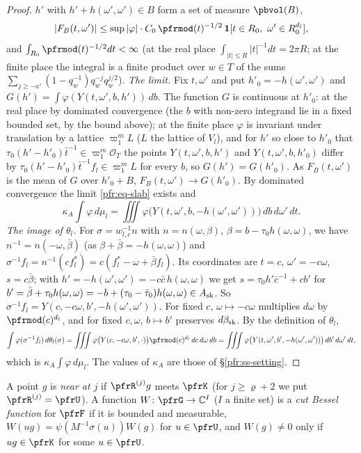 \documentclass[10pt]{amsart}
\theoremstyle{definition}
\theoremstyle{remark}
\newcommand{\C}{\mathbb C}
\providecommand{\auO}{\mathcal O}
\begin{document}
\begin{proof}
$h'$ with $h'+h(\omega',\omega')\in B$ form a set of measure $\pbvol(B)$,
\[
|F_B(t,\omega')|\le\sup|\varphi|\cdot C_0\,\pfrmod(t)^{-1/2}\,\mathbf 1[t\in R_0,\ \omega'\in R_0^{d_l}],
\]
and $\int_{R_0}\pfrmod(t)^{-1/2}dt<\infty$ (at the real place $\int_{|t|\le R}|t|^{-1}dt=2\pi R$; at the finite place
the integral is a finite product over $w\in T$ of the sums $\sum_{j\ge-a'}(1-q_w^{-1})q_w^{-j}q_w^{j/2}$).
\emph{The limit.} Fix $t,\omega'$ and put $h'_0=-h(\omega',\omega')$ and $G(h')=\int\varphi(Y(t,\omega',b,h'))\,db$. The
function $G$ is continuous at $h'_0$: at the real place by dominated convergence (the $b$ with non-zero integrand lie in
a fixed bounded set, by the bound above); at the finite place $\varphi$ is invariant under translation by a lattice
$\varpi_1^{m}L$ ($L$ the lattice of $V_l$), and for $h'$ so close to $h'_0$ that $\tau_0(h'-h'_0)\bar t^{-1}\in\varpi_1^m\auO_T$
the points $Y(t,\omega',b,h')$ and $Y(t,\omega',b,h'_0)$ differ by $\tau_0(h'-h'_0)\bar t^{-1}f_l\in\varpi_1^mL$ for every $b$, so
$G(h')=G(h'_0)$. As $F_B(t,\omega')$ is the mean of $G$ over
$h'_0+B$, $F_B(t,\omega')\to G(h'_0)$. By dominated convergence the limit \eqref{pfr:eq-slab} exists and
\[
\kappa_A\int\varphi\,d\mu_l=\iiint\varphi\bigl(Y(t,\omega',b,-h(\omega',\omega'))\bigr)\,db\,d\omega'\,dt .
\]
\emph{The image of $\theta_l$.} For $\sigma=w_{l,c}^{-1}n$ with $n=n(\omega,\beta)$, $\beta=b-\tau_0h(\omega,\omega)$, we have
$n^{-1}=n(-\omega,\bar\beta)$ (as $\beta+\bar\beta=-h(\omega,\omega)$) and $\sigma^{-1}f_l=n^{-1}(cf_l^*)=c(f_l^*-\omega+\bar\beta f_l)$. Its
coordinates are $t=c$, $\omega'=-c\omega$, $s=c\bar\beta$; with $h'=-h(\omega',\omega')=-c\bar c\,h(\omega,\omega)$ we get
$s=\tau_0h'\bar c^{-1}+cb'$ for $b'=\bar\beta+\tau_0h(\omega,\omega)=-b+(\tau_0-\bar\tau_0)h(\omega,\omega)\in A_{\rm sk}$. So
$\sigma^{-1}f_l=Y(c,-c\omega,b',-h(\omega',\omega'))$. For fixed $c$, $\omega\mapsto-c\omega$ multiplies $d\omega$ by
$\pfrmod(c)^{d_l}$, and for fixed $c,\omega$, $b\mapsto b'$ preserves $d\beta_{\rm sk}$. By the definition of $\theta_l$,
\[
\int\varphi(\sigma^{-1}f_l)\,d\theta_l(\sigma)=\iiint\varphi\bigl(Y(c,-c\omega,b',\cdot)\bigr)\pfrmod(c)^{d_l}\,dc\,d\omega\,db=
\iiint\varphi\bigl(Y(t,\omega',b',-h(\omega',\omega'))\bigr)\,db'\,d\omega'\,dt,
\]
which is $\kappa_A\int\varphi\,d\mu_l$. The values of $\kappa_A$ are those of \S\ref{pfr:ss-setting}.
\end{proof}

A point $g$ is \emph{near at $j$} if $\pfrR^{(j)}g$ meets $\pfrK$ (for $j\ge\varrho+2$ we put $\pfrR^{(j)}=\pfrU$). A function $W\colon\pfrG\to\C^I$ ($I$
a finite set) is a \emph{cut Bessel function} for $\pfrF$ if it is bounded and measurable,
$W(ug)=\psi(M^{-1}\sigma(u))W(g)$ for $u\in\pfrU$, and $W(g)\ne0$ only if $ug\in\pfrK$ for some
$u\in\pfrU$.
\end{document}
